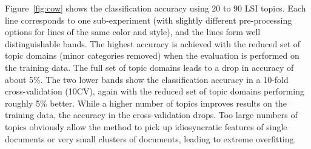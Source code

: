 \documentclass[11pt]{article}
\begin{document}
\begin{table}[!ht]
  \centering
  \caption{Evaluation at best achievable accuracy with the reduced set of topic domains in 10-fold cross-validation ($^{\mathrm{\tiny *}}$weighted average across all categories)}
  \label{tab:quality}
\end{table}

Figure~\ref{fig:cow} shows the classification accuracy using 20 to 90 LSI topics.
Each line corresponds to one sub-experiment (with slightly different pre-processing options for lines of the same color and style), and the lines form well distinguishable bands.
The highest accuracy is achieved with the reduced set of topic domains (minor categories removed) when the evaluation is performed on the training data.
The full set of topic domains leads to a drop in accuracy of about 5\%.
The two lower bands show the classification accuracy in a 10-fold cross-validation (10CV), again with the reduced set of topic domains performing roughly 5\% better.
While a higher number of topics improves results on the training data, the accuracy in the cross-validation drops.
Too large numbers of topics obviously allow the method to pick up idiosyncratic features of single documents or very small clusters of documents, leading to extreme overfitting.
\end{document}
